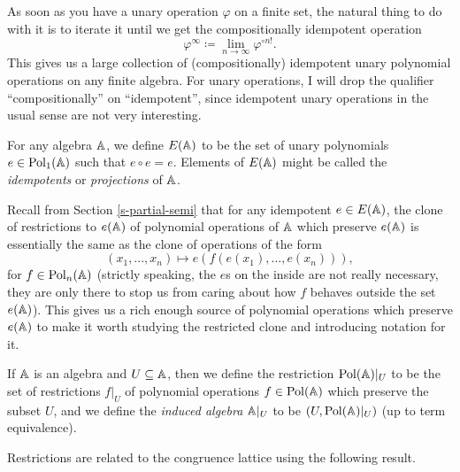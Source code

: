 \begin{appendices}
As soon as you have a unary operation $\varphi$ on a finite set, the natural thing to do with it is to iterate it until we get the compositionally idempotent operation
\[
\varphi^{\infty} \coloneqq \lim_{n\rightarrow \infty} \varphi^{\circ n!}.
\]
This gives us a large collection of (compositionally) idempotent unary polynomial operations on any finite algebra. For unary operations, I will drop the qualifier ``compositionally'' on ``idempotent'', since idempotent unary operations in the usual sense are not very interesting.

\begin{defn} For any algebra $\mathbb{A}$, we define $E(\mathbb{A})$ to be the set of unary polynomials $e \in \operatorname{Pol}_1(\mathbb{A})$ such that $e \circ e = e$. Elements of $E(\mathbb{A})$ might be called the \emph{idempotents} or \emph{projections} of $\mathbb{A}$.
\end{defn}

Recall from Section \ref{s-partial-semi} that for any idempotent $e \in E(\mathbb{A})$, the clone of restrictions to $e(\mathbb{A})$ of polynomial operations of $\mathbb{A}$ which preserve $e(\mathbb{A})$ is essentially the same as the clone of operations of the form
\[
(x_1, ..., x_n) \mapsto e(f(e(x_1), ..., e(x_n))),
\]
for $f \in \operatorname{Pol}_n(\mathbb{A})$ (strictly speaking, the $e$s on the inside are not really necessary, they are only there to stop us from caring about how $f$ behaves outside the set $e(\mathbb{A})$). This gives us a rich enough source of polynomial operations which preserve $e(\mathbb{A})$ to make it worth studying the restricted clone and introducing notation for it.

\begin{defn} If $\mathbb{A}$ is an algebra and $U \subseteq \mathbb{A}$, then we define the restriction $\operatorname{Pol}(\mathbb{A})|_U$ to be the set of restrictions $f|_U$ of polynomial operations $f \in \operatorname{Pol}(\mathbb{A})$ which preserve the subset $U$, and we define the \emph{induced algebra} $\mathbb{A}|_U$ to be $(U, \operatorname{Pol}(\mathbb{A})|_U)$ (up to term equivalence).
\end{defn}

Restrictions are related to the congruence lattice using the following result.


\end{appendices}
